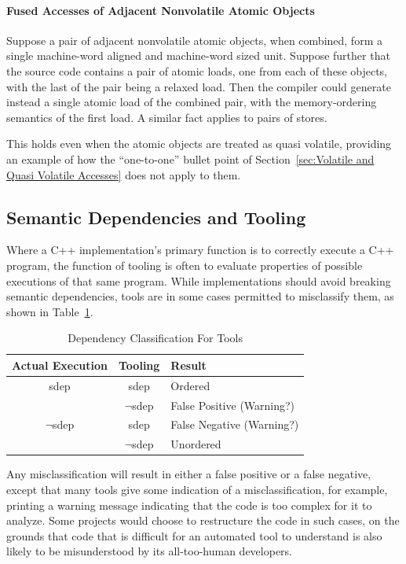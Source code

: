 \documentclass[10]{article}
\begin{document}
\paragraph{Fused Accesses of Adjacent Nonvolatile Atomic Objects}
Suppose a pair of adjacent nonvolatile atomic objects, when combined,
form a single machine-word aligned and machine-word sized unit.
Suppose further that the source code contains a pair of atomic
loads, one from each of these objects, with the last of the pair
being a relaxed load.
Then the compiler could generate instead
a single atomic load of the combined pair,
with the memory-ordering semantics of the first load.
A similar fact applies to pairs of stores.

This holds even when the atomic objects are treated as quasi volatile,
providing an example of how the ``one-to-one'' bullet point of
Section~\ref{sec:Volatile and Quasi Volatile Accesses} does not apply
to them.

\subsection{Semantic Dependencies and Tooling}
\label{sec:Semantic Dependencies and Tooling}

Where a C++ implementation's primary function is to correctly execute
a C++ program, the function of tooling is often to evaluate properties
of possible executions of that same program.
While implementations should avoid breaking semantic dependencies,
tools are in some cases permitted to misclassify them, as shown in
Table~\ref{tab:Dependency Classification For Tools}.

\begin{table}
\centering
\begin{tabular}{c|c|l}
Actual Execution	& Tooling		& Result \\
\hline
sdep			& sdep			& Ordered \\
\cline{2-3}
			& $\neg$sdep		& False Positive (Warning?) \\
\hline
$\neg$sdep		& sdep			& False Negative (Warning?) \\
\cline{2-3}
			& $\neg$sdep		& Unordered \\
\end{tabular}
\caption{Dependency Classification For Tools}
\label{tab:Dependency Classification For Tools}
\end{table}

Any misclassification will result in either a false positive or
a false negative, except that many tools give some indication of a
misclassification, for example, printing a warning message indicating
that the code is too complex for it to analyze.
Some projects would choose to restructure the code in such cases, on the
grounds that code that is difficult for an automated tool to understand
is also likely to be misunderstood by its all-too-human developers.
\end{document}
